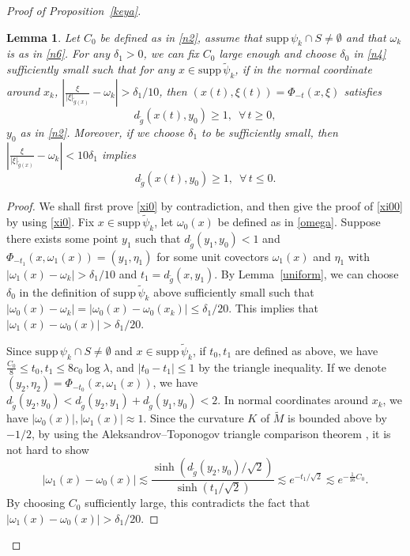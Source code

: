 \documentclass[10pt]{amsart}
\newtheorem{lemma}[theorem]{Lemma}
\newcommand{\la}{\lambda}
\newcommand{\supp}{\mathrm{supp }}
\newcommand{\1}{{\bf 1}}
\begin{document}
\begin{proof}[Proof of Proposition~\ref{keya}]
\begin{lemma}\label{propogation}
Let $C_0$ be defined as in \eqref{n2},
assume that $\supp\,\psi_k \cap S\neq \emptyset$ and that $\omega_k$ is as in \eqref{n6}.
For any $\delta_1>0$, we can fix $C_0$ large enough and choose $\delta_0$ in \eqref{n4} sufficiently small such that for any $x\in \supp \,\tilde\psi_k$, if in the normal coordinate around $x_k$, $\left|\frac{\xi}{|\xi|_{{\tilde{g}(x)}}}-\omega_k\right|>\delta_1/10$, then $(x(t),\xi(t))=\Phi_{-t}(x,\xi)$ satisfies
     \begin{equation}\label{xi0}
     d_{\tilde g}(x(t), y_0)\ge 1, \,\,\,\forall\, t\ge0,
 \end{equation}
 $y_0$ as in \eqref{n2}.
 Moreover, if we choose $\delta_1$ to be sufficiently small, then $\left|\frac{\xi}{|\xi|_{{\tilde{g}(x)}}}-\omega_k\right|<10\delta_1$ implies  
  \begin{equation}\label{xi00}
     d_{\tilde g}(x(t), y_0)\ge 1, \,\,\,\forall\, t\le0.
 \end{equation}
\end{lemma}


\begin{proof}
{{We shall first prove \eqref{xi0} by contradiction, and then give the proof of \eqref{xi00} by using \eqref{xi0}. 
Fix $x\in \supp \,\tilde\psi_k$, let $\omega_0(x)$ be defined as in \eqref{omega}.
Suppose there exists some point $y_1$ such that $d_{\tilde g}(y_1,y_0)<1$ and  $\Phi_{-t_1}(x, \omega_1(x))=(y_1,\eta_1)$ for some unit {covectors $\omega_1(x)$ and $\eta_1$} with $\left|\omega_1(x)-\omega_k\right|>\delta_1/10$ and  $t_1=d_{\tilde g}(x,y_1)$. 
By Lemma~\ref{uniform}, we can choose $\delta_0$ in the definition of $\supp\,\tilde \psi_k$ above sufficiently small such that 
$|\omega_0(x)-\omega_k|=|\omega_0(x)-\omega_0(x_k)|\le \delta_1/20$. This implies that 
$\left|\omega_1(x)-\omega_0(x)\right|>\delta_1/20$.}}

{Since $\supp\,\psi_k \cap S\neq \emptyset$} and  $x\in \supp\,\tilde \psi_k$, if $t_0, t_1$ are defined as above, we have $\frac {C_0}8\le t_0,t_1\le 8c_0\log\la$, and $|t_0-t_1|\le 1$  by the triangle inequality.
  If we denote $( y_2, \eta_2)=\Phi_{{-t_0}}(x,\omega_1(x))$, we have $d_{\tilde g}( y_2, y_0)<d_{\tilde g}( y_2, y_1)+d_{\tilde g}( y_1, y_0)<2$. In normal coordinates around $x_k$, we have $|\omega_0(x)|,|\omega_1(x)|\approx 1$. Since the curvature $K$ of $\tilde M$ is bounded {above by $-1/2$}, by using {the Aleksandrov--Toponogov triangle comparison theorem \cite[Theorem 4.1]{karcher}}, it is not hard to show
\begin{equation}\label{xi3}
   {|\omega_1(x)-\omega_0(x)|\lesssim \frac{\sinh(d_{\tilde g}( y_2,y_0){/\sqrt{2}})}{\sinh(t_1/\sqrt{2})}\lesssim e^{-t_1/\sqrt{2}}\lesssim e^{-\frac{1}{16} C_0}.}
\end{equation}
By choosing $C_0$ sufficiently large, this contradicts  the fact that $\left|\omega_1(x)-\omega_0(x)\right|>\delta_1/20$.


\end{proof}
\end{proof}
\end{document}

